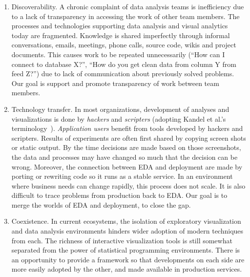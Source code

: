 \begin{enumerate}
\item Discoverability. A chronic complaint of data analysis teams is
inefficiency due to a lack of transparency in accessing the work of
other team members. The processes and technologies supporting
data analysis and visual analytics today are fragmented.
Knowledge is shared imperfectly through informal conversations, emails,
meetings, phone calls, source code, wikis and project documents.
This causes work to be repeated unnecessarily
(``How can I connect to database X?'', ``How do you get clean data
from column Y from feed Z?'') due to lack of communication about
previously solved problems. 
Our goal is support and
promote transparency of work between team members.

\item Technology transfer.
In most organizations, development of analyses and visualizations 
is done by \emph{hackers} and \emph{scripters} (adopting Kandel et al.'s
terminology~\cite{Kandel:2012:EDA}). \emph{Application users} 
benefit from tools developed by hackers and scripters.
Results of experiments are often first shared by copying screen
shots or static output. By the time decisions are made based on
those screenshots, the data and processes may have
changed so much that the decision can be wrong.
Moreover, the connection between EDA and deployment
are made by porting or rewriting code so it runs as a stable service.
In an environment where business needs can change rapidly, this
process does not scale. It is also difficult to trace problems
from production back to EDA.
Our goal is to merge the worlds of EDA and deployment, to close the gap.

\item Coexistence. In current ecosystems, the isolation of exploratory
visualization and data analysis environments hinders wider adoption of
modern techniques from each.
The richness of interactive visualization tools is still somewhat
separated from the power of statistical programming environments.
There is an opportunity to provide a framework so that developments
on each side are more easily adopted by the other, and made available
in production services.

\end{enumerate}


